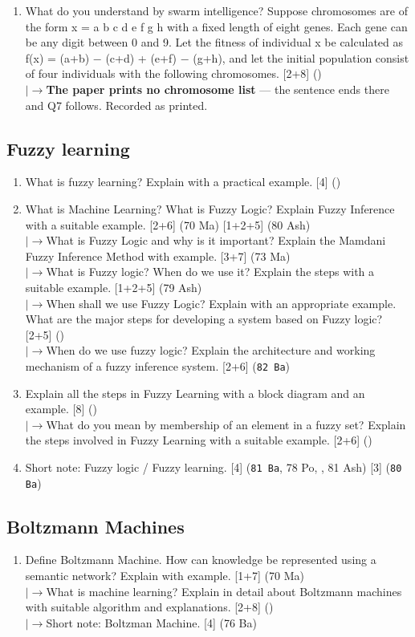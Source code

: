 \documentclass[12pt]{article}
\newcommand{\lb}{\\$\left|\rightarrow\right.$}
\begin{document}
\begin{enumerate}[topsep=0pt, noitemsep]
      \item What do you understand by swarm intelligence? Suppose chromosomes are of the form x = a b c d e f g h with a fixed length of eight genes. Each gene can be any digit between 0 and 9. Let the fitness of individual x be calculated as f(x) = (a+b) $-$ (c+d) + (e+f) $-$ (g+h), and let the initial population consist of four individuals with the following chromosomes. \hfill [2+8] ()
        \lb \textbf{The paper prints no chromosome list} --- the sentence ends there and Q7 follows. Recorded as printed.
    \end{enumerate}

  \subsection{Fuzzy learning}
    \begin{enumerate}[topsep=0pt, noitemsep]
      \item What is fuzzy learning? Explain with a practical example. \hfill [4] ()

      \item What is Machine Learning? What is Fuzzy Logic? Explain Fuzzy Inference with a suitable example. \hfill [2+6] (70 Ma) [1+2+5] (80 Ash)
        \lb What is Fuzzy Logic and why is it important? Explain the Mamdani Fuzzy Inference Method with example. \hfill [3+7] (73 Ma)
        \lb What is Fuzzy logic? When do we use it? Explain the steps with a suitable example. \hfill [1+2+5] (79 Ash)
        \lb When shall we use Fuzzy Logic? Explain with an appropriate example. What are the major steps for developing a system based on Fuzzy logic? \hfill [2+5] ()
        \lb When do we use fuzzy logic? Explain the architecture and working mechanism of a fuzzy inference system. \hfill [2+6] (\texttt{82 Ba})

      \item Explain all the steps in Fuzzy Learning with a block diagram and an example. \hfill [8] ()
        \lb What do you mean by membership of an element in a fuzzy set? Explain the steps involved in Fuzzy Learning with a suitable example. \hfill [2+6] ()

      \item Short note: Fuzzy logic / Fuzzy learning. \hfill [4] (\texttt{81 Ba}, 78 Po, , 81 Ash) [3] (\texttt{80 Ba})
    \end{enumerate}

  \subsection{Boltzmann Machines}
    \begin{enumerate}[topsep=0pt, noitemsep]
      \item Define Boltzmann Machine. How can knowledge be represented using a semantic network? Explain with example. \hfill [1+7] (70 Ma)
        \lb What is machine learning? Explain in detail about Boltzmann machines with suitable algorithm and explanations. \hfill [2+8] ()
        \lb Short note: Boltzman Machine. \hfill [4] (76 Ba)
    \end{enumerate}
\end{document}
